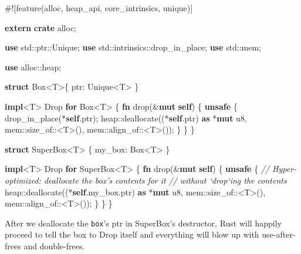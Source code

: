 \documentclass[a4paper,]{book}
\newenvironment{Shaded}{\begin{snugshade}}{\end{snugshade}}
\newcommand{\KeywordTok}[1]{\textcolor[rgb]{0.13,0.29,0.53}{\textbf{{#1}}}}
\newcommand{\DataTypeTok}[1]{\textcolor[rgb]{0.13,0.29,0.53}{{#1}}}
\newcommand{\CommentTok}[1]{\textcolor[rgb]{0.56,0.35,0.01}{\textit{{#1}}}}
\newcommand{\BuiltInTok}[1]{{#1}}
\newcommand{\AttributeTok}[1]{\textcolor[rgb]{0.77,0.63,0.00}{{#1}}}
\newcommand{\NormalTok}[1]{{#1}}
\begin{document}
\begin{Shaded}
\begin{Highlighting}[]
\AttributeTok{#![}\NormalTok{feature}\AttributeTok{(}\NormalTok{alloc}\AttributeTok{,} \NormalTok{heap_api}\AttributeTok{,} \NormalTok{core_intrinsics}\AttributeTok{,} \NormalTok{unique}\AttributeTok{)]}

\KeywordTok{extern} \KeywordTok{crate} \NormalTok{alloc;}

\KeywordTok{use} \NormalTok{std::ptr::Unique;}
\KeywordTok{use} \NormalTok{std::intrinsics::drop_in_place;}
\KeywordTok{use} \NormalTok{std::mem;}

\KeywordTok{use} \NormalTok{alloc::heap;}

\KeywordTok{struct} \DataTypeTok{Box}\NormalTok{<T>\{ ptr: Unique<T> \}}

\KeywordTok{impl}\NormalTok{<T> }\BuiltInTok{Drop} \KeywordTok{for} \DataTypeTok{Box}\NormalTok{<T> \{}
    \KeywordTok{fn} \NormalTok{drop(&}\KeywordTok{mut} \KeywordTok{self}\NormalTok{) \{}
        \KeywordTok{unsafe} \NormalTok{\{}
            \NormalTok{drop_in_place(*}\KeywordTok{self}\NormalTok{.ptr);}
            \NormalTok{heap::deallocate((*}\KeywordTok{self}\NormalTok{.ptr) }\KeywordTok{as} \NormalTok{*}\KeywordTok{mut} \DataTypeTok{u8}\NormalTok{,}
                             \NormalTok{mem::size_of::<T>(),}
                             \NormalTok{mem::align_of::<T>());}
        \NormalTok{\}}
    \NormalTok{\}}
\NormalTok{\}}

\KeywordTok{struct} \NormalTok{SuperBox<T> \{ my_box: }\DataTypeTok{Box}\NormalTok{<T> \}}

\KeywordTok{impl}\NormalTok{<T> }\BuiltInTok{Drop} \KeywordTok{for} \NormalTok{SuperBox<T> \{}
    \KeywordTok{fn} \NormalTok{drop(&}\KeywordTok{mut} \KeywordTok{self}\NormalTok{) \{}
        \KeywordTok{unsafe} \NormalTok{\{}
            \CommentTok{// Hyper-optimized: deallocate the box's contents for it}
            \CommentTok{// without `drop`ing the contents}
            \NormalTok{heap::deallocate((*}\KeywordTok{self}\NormalTok{.my_box.ptr) }\KeywordTok{as} \NormalTok{*}\KeywordTok{mut} \DataTypeTok{u8}\NormalTok{,}
                             \NormalTok{mem::size_of::<T>(),}
                             \NormalTok{mem::align_of::<T>());}
        \NormalTok{\}}
    \NormalTok{\}}
\NormalTok{\}}
\end{Highlighting}
\end{Shaded}

After we deallocate the \texttt{box}'s ptr in SuperBox's destructor,
Rust will happily proceed to tell the box to Drop itself and everything
will blow up with use-after-frees and double-frees.
\end{document}
